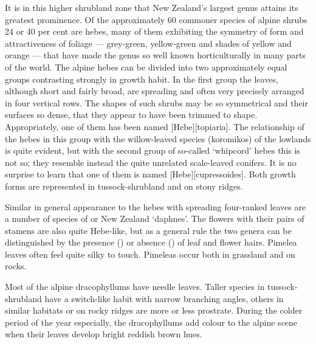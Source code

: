 It is in this higher shrubland zone that New Zealand's largest genus  attains its greatest prominence.
Of the approximately 60 commoner species of alpine shrubs 24 or 40 per cent are hebes, many of them exhibiting the symmetry of form and attractiveness of foliage --- grey-green, yellow-green and shades of yellow and orange --- that have made the genus so well known horticulturally in many parts of the world.
The alpine hebes can be divided into two approximately equal groups contrasting strongly in growth habit.
In the first group the leaves, although short and fairly broad, are spreading and often very precisely arranged in four vertical rows.
The shapes of such shrubs may be so symmetrical and their surfaces so dense, that they appear to have been trimmed to shape.
Appropriately, one of them has been named [Hebe][topiaria].
The relationship of the hebes in this group with the willow-leaved species (koromikos) of the lowlands is quite evident, but with the second group of so-called `whipcord' hebes this is not so; they resemble instead the quite unrelated scale-leaved conifers.
It is no surprise to learn that one of them is named [Hebe][cupressoides].
Both growth forms are represented in tussock-shrubland and on stony ridges.

Similar in general appearance to the hebes with spreading four-ranked leaves are a number of species of  or New Zealand `daphnes'.
The flowers with their pairs of stamens are also quite Hebe-like, but as a general rule the two genera can be distinguished by the presence () or absence () of leaf and flower hairs.
Pimelea leaves often feel quite silky to touch.
Pimeleas occur both in grassland and on rocks.

Most of the alpine dracophyllums have needle leaves.
Taller species in tussock-shrubland have a switch-like habit with narrow branching angles, others in similar habitats or on rocky ridges are more or less prostrate.
During the colder period of the year especially, the dracophyllums add colour to the alpine scene when their leaves develop bright reddish brown hues.

